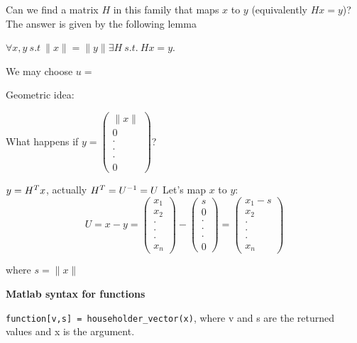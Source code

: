 \documentclass[computationalMathematics.tex]{subfiles}
\begin{document}
Can we find a matrix $H$ in this family that maps $x$ to $y$ (equivalently $Hx = y$)? The answer is given by the following lemma

\begin{lemma}
 $\forall x, y ~ s.t ~ \|x\| = \|y\| \exists H ~ s.t. ~ Hx = y$.

We may choose $u = $ 

\end{lemma}

Geometric idea:


What happens if $y = \begin{pmatrix} \|x\|\\ 0\\ \cdot\\ \cdot\\ \cdot\\ 0\end{pmatrix}$?
  
  $y = {H}^{T}x$, actually ${H}^{T} = {U}^{-1} = U$
  Let's map $x$ to $y$: 
  \[
    U = x - y =
  \begin{pmatrix} {}x_{1}\\ {x}_{2}\\ \cdot\\ \cdot\\ \cdot\\{x}_{n}\end{pmatrix} - \begin{pmatrix} s\\ 0\\ \cdot\\ \cdot\\ \cdot\\ 0 \end{pmatrix} = 
    \begin{pmatrix} {x}_{1}-s\\ {x}_{2}\\ \cdot\\ \cdot\\ \cdot\\ {x}_{n} \end{pmatrix}
  \]
      
      where $s = \|x\|$

\textbf{Matlab syntax for functions}

{\tt function[v,s] = householder\_vector(x)}, where v and s are the returned values and x is the argument.
\end{document}
